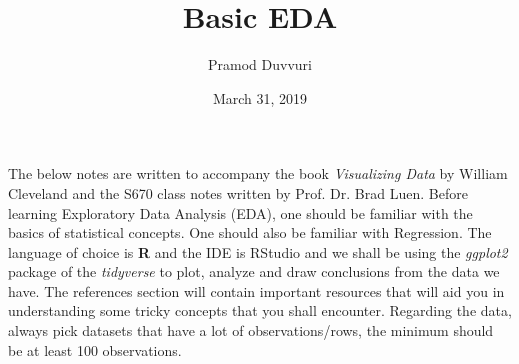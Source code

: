 \documentclass[11pt]{article}
\title{Basic EDA}
\author{Pramod Duvvuri}
\date{March 31, 2019}
\begin{document}
	\maketitle
	The below notes are written to accompany the book \textit{Visualizing Data} by William Cleveland and the S670 class notes written by Prof. Dr. Brad Luen. Before learning Exploratory Data Analysis (EDA), one should be familiar with the basics of statistical concepts. One should also be familiar with Regression. The language of choice is \textbf{R} and the IDE is RStudio and we shall be using the \textit{ggplot2} package of the \textit{tidyverse} to plot, analyze and draw conclusions from the data we have. The references section will contain important resources that will aid you in understanding some tricky concepts that you shall encounter. Regarding the data, always pick datasets that have a lot of observations/rows, the minimum should be at least 100 observations.
\end{document}
